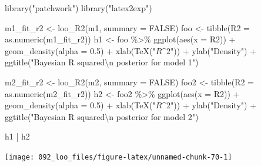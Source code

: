 \documentclass[
  10pt,
  italian,
  a4paper,
  extrafontsizes,onecolumn,openright
  ]{memoir}
\newenvironment{Shaded}{\begin{snugshade}}{\end{snugshade}}
\newcommand{\AttributeTok}[1]{\textcolor[rgb]{0.77,0.63,0.00}{#1}}
\newcommand{\ConstantTok}[1]{\textcolor[rgb]{0.00,0.00,0.00}{#1}}
\newcommand{\FloatTok}[1]{\textcolor[rgb]{0.00,0.00,0.81}{#1}}
\newcommand{\FunctionTok}[1]{\textcolor[rgb]{0.00,0.00,0.00}{#1}}
\newcommand{\NormalTok}[1]{#1}
\newcommand{\OtherTok}[1]{\textcolor[rgb]{0.56,0.35,0.01}{#1}}
\newcommand{\SpecialCharTok}[1]{\textcolor[rgb]{0.00,0.00,0.00}{#1}}
\newcommand{\StringTok}[1]{\textcolor[rgb]{0.31,0.60,0.02}{#1}}
\theoremstyle{definition}
\theoremstyle{definition}
\theoremstyle{definition}
\theoremstyle{definition}
\theoremstyle{remark}
\begin{document}
\begin{Shaded}
\begin{Highlighting}[]
\FunctionTok{library}\NormalTok{(}\StringTok{"patchwork"}\NormalTok{)}
\FunctionTok{library}\NormalTok{(}\StringTok{"latex2exp"}\NormalTok{)}

\NormalTok{m1\_fit\_r2 }\OtherTok{\textless{}{-}} \FunctionTok{loo\_R2}\NormalTok{(m1, }\AttributeTok{summary =} \ConstantTok{FALSE}\NormalTok{)}
\NormalTok{foo }\OtherTok{\textless{}{-}} \FunctionTok{tibble}\NormalTok{(}\AttributeTok{R2 =} \FunctionTok{as.numeric}\NormalTok{(m1\_fit\_r2))}
\NormalTok{h1 }\OtherTok{\textless{}{-}}\NormalTok{ foo }\SpecialCharTok{\%\textgreater{}\%}
  \FunctionTok{ggplot}\NormalTok{(}\FunctionTok{aes}\NormalTok{(}\AttributeTok{x =}\NormalTok{ R2)) }\SpecialCharTok{+}
  \FunctionTok{geom\_density}\NormalTok{(}\AttributeTok{alpha =} \FloatTok{0.5}\NormalTok{) }\SpecialCharTok{+}
  \FunctionTok{xlab}\NormalTok{(}\FunctionTok{TeX}\NormalTok{(}\StringTok{"$R\^{}2$"}\NormalTok{)) }\SpecialCharTok{+}
  \FunctionTok{ylab}\NormalTok{(}\StringTok{"Density"}\NormalTok{) }\SpecialCharTok{+}
  \FunctionTok{ggtitle}\NormalTok{(}\StringTok{"Bayesian R squared}\SpecialCharTok{\textbackslash{}n}\StringTok{ posterior for model 1"}\NormalTok{)}

\NormalTok{m2\_fit\_r2 }\OtherTok{\textless{}{-}} \FunctionTok{loo\_R2}\NormalTok{(m2, }\AttributeTok{summary =} \ConstantTok{FALSE}\NormalTok{)}
\NormalTok{foo2 }\OtherTok{\textless{}{-}} \FunctionTok{tibble}\NormalTok{(}\AttributeTok{R2 =} \FunctionTok{as.numeric}\NormalTok{(m2\_fit\_r2))}
\NormalTok{h2 }\OtherTok{\textless{}{-}}\NormalTok{ foo2 }\SpecialCharTok{\%\textgreater{}\%}
  \FunctionTok{ggplot}\NormalTok{(}\FunctionTok{aes}\NormalTok{(}\AttributeTok{x =}\NormalTok{ R2)) }\SpecialCharTok{+}
  \FunctionTok{geom\_density}\NormalTok{(}\AttributeTok{alpha =} \FloatTok{0.5}\NormalTok{) }\SpecialCharTok{+}
  \FunctionTok{xlab}\NormalTok{(}\FunctionTok{TeX}\NormalTok{(}\StringTok{"$R\^{}2$"}\NormalTok{)) }\SpecialCharTok{+}
  \FunctionTok{ylab}\NormalTok{(}\StringTok{"Density"}\NormalTok{) }\SpecialCharTok{+}
  \FunctionTok{ggtitle}\NormalTok{(}\StringTok{"Bayesian R squared}\SpecialCharTok{\textbackslash{}n}\StringTok{ posterior for model 2"}\NormalTok{)}

\NormalTok{h1 }\SpecialCharTok{|}\NormalTok{ h2}
\end{Highlighting}
\end{Shaded}

\begin{center}\texttt{[image: 092\_loo\_files/figure-latex/unnamed-chunk-70-1]} \end{center}
\end{document}
